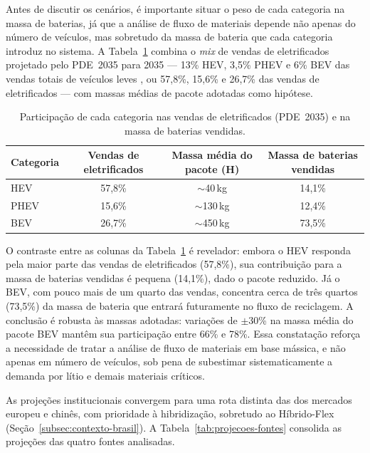 Antes de discutir os cenários, é importante situar o peso de cada categoria na
massa de baterias, já que a análise de fluxo de materiais depende não apenas do
número de veículos, mas sobretudo da massa de bateria que cada categoria introduz
no sistema. A Tabela~\ref{tab:categoria-massa} combina o \textit{mix} de vendas de
eletrificados projetado pelo PDE~2035 para 2035 — 13\% HEV, 3,5\% PHEV e 6\% BEV
das vendas totais de veículos leves \cite{EPE2025}, ou 57,8\%, 15,6\% e 26,7\% das
vendas de eletrificados — com massas médias de pacote adotadas como hipótese.

\begin{table}[H]
\centering
\caption{Participação de cada categoria nas vendas de eletrificados (PDE~2035) e
         na massa de baterias vendidas.}
\label{tab:categoria-massa}
\small
\setlength{\tabcolsep}{5pt}
\begin{tabular}{lccc}
\toprule
\textbf{Categoria} & \textbf{Vendas de eletrificados} & \textbf{Massa média do pacote (H)} &
\textbf{Massa de baterias vendidas} \\
\midrule
HEV  & 57,8\% & $\sim$40\,kg  & 14,1\% \\
PHEV & 15,6\% & $\sim$130\,kg & 12,4\% \\
BEV  & 26,7\% & $\sim$450\,kg & 73,5\% \\
\bottomrule
\end{tabular}
\end{table}

O contraste entre as colunas da Tabela~\ref{tab:categoria-massa} é revelador:
embora o HEV responda pela maior parte das vendas de eletrificados (57,8\%), sua
contribuição para a massa de baterias vendidas é pequena (14,1\%), dado o pacote
reduzido. Já o BEV, com pouco mais de um quarto das vendas, concentra cerca de
três quartos (73,5\%) da massa de bateria que entrará futuramente no fluxo de
reciclagem. A conclusão é robusta às massas adotadas: variações de $\pm$30\% na
massa média do pacote BEV mantêm sua participação entre 66\% e 78\%. Essa
constatação reforça a necessidade de tratar a análise de fluxo de materiais em
base mássica, e não apenas em número de veículos, sob pena de subestimar
sistematicamente a demanda por lítio e demais materiais críticos.

As projeções institucionais convergem para uma rota distinta das dos mercados
europeu e chinês, com prioridade à hibridização, sobretudo ao Híbrido-Flex
(Seção~\ref{subsec:contexto-brasil}). A Tabela~\ref{tab:projecoes-fontes}
consolida as projeções das quatro fontes analisadas.

